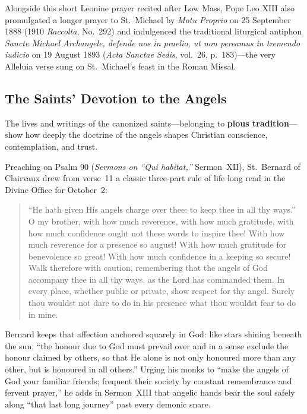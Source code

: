 Alongside this short Leonine prayer recited after Low Mass, Pope Leo XIII also promulgated a longer prayer to St.~Michael by \emph{Motu Proprio} on 25 September 1888 (1910 \emph{Raccolta}, No.~292) and indulgenced the traditional liturgical antiphon \emph{Sancte Michael Archangele, defende nos in praelio, ut non pereamus in tremendo iudicio} on 19 August 1893 (\emph{Acta Sanctae Sedis}, vol.~26, p.~183)---the very Alleluia verse sung on St.~Michael's feast in the Roman Missal.

\subsection{The Saints' Devotion to the Angels}

The lives and writings of the canonized saints---belonging to \textbf{pious tradition}---show how deeply the doctrine of the angels shapes Christian conscience, contemplation, and trust.

Preaching on Psalm 90 (\emph{Sermons on ``Qui habitat,''} Sermon~XII), St.~Bernard of Clairvaux drew from verse~11 a classic three-part rule of life long read in the Divine Office for October~2:

\begin{quotation}
``He hath given His angels charge over thee: to keep thee in all thy ways.'' O my brother, with how much reverence, with how much gratitude, with how much confidence ought not these words to inspire thee! With how much reverence for a presence so august! With how much gratitude for benevolence so great! With how much confidence in a keeping so secure! Walk therefore with caution, remembering that the angels of God accompany thee in all thy ways, as the Lord has commanded them. In every place, whether public or private, show respect for thy angel. Surely thou wouldst not dare to do in his presence what thou wouldst fear to do in mine.
\end{quotation}

Bernard keeps that affection anchored squarely in God: like stars shining beneath the sun, ``the honour due to God must prevail over and in a sense exclude the honour claimed by others, so that He alone is not only honoured more than any other, but is honoured in all others.'' Urging his monks to ``make the angels of God your familiar friends; frequent their society by constant remembrance and fervent prayer,'' he adds in Sermon~XIII that angelic hands bear the soul safely along ``that last long journey'' past every demonic snare.

